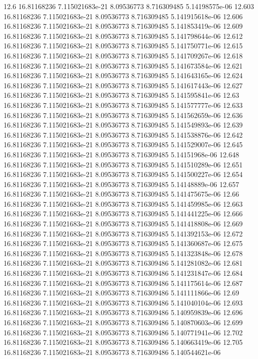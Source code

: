 {12.6 16.81168236 7.115021683e-21 8.09536773 8.716309485 5.14198575e-06
12.603 16.81168236 7.115021683e-21 8.09536773 8.716309485 5.141915618e-06
12.606 16.81168236 7.115021683e-21 8.09536773 8.716309485 5.141853419e-06
12.609 16.81168236 7.115021683e-21 8.09536773 8.716309485 5.141798644e-06
12.612 16.81168236 7.115021683e-21 8.09536773 8.716309485 5.141750771e-06
12.615 16.81168236 7.115021683e-21 8.09536773 8.716309485 5.141709267e-06
12.618 16.81168236 7.115021683e-21 8.09536773 8.716309485 5.141673584e-06
12.621 16.81168236 7.115021683e-21 8.09536773 8.716309485 5.141643165e-06
12.624 16.81168236 7.115021683e-21 8.09536773 8.716309485 5.141617443e-06
12.627 16.81168236 7.115021683e-21 8.09536773 8.716309485 5.141595841e-06
12.63 16.81168236 7.115021683e-21 8.09536773 8.716309485 5.141577777e-06
12.633 16.81168236 7.115021683e-21 8.09536773 8.716309485 5.141562659e-06
12.636 16.81168236 7.115021683e-21 8.09536773 8.716309485 5.141549893e-06
12.639 16.81168236 7.115021683e-21 8.09536773 8.716309485 5.141538876e-06
12.642 16.81168236 7.115021683e-21 8.09536773 8.716309485 5.141529007e-06
12.645 16.81168236 7.115021683e-21 8.09536773 8.716309485 5.14151968e-06
12.648 16.81168236 7.115021683e-21 8.09536773 8.716309485 5.141510289e-06
12.651 16.81168236 7.115021683e-21 8.09536773 8.716309485 5.141500227e-06
12.654 16.81168236 7.115021683e-21 8.09536773 8.716309485 5.14148889e-06
12.657 16.81168236 7.115021683e-21 8.09536773 8.716309485 5.141475675e-06
12.66 16.81168236 7.115021683e-21 8.09536773 8.716309485 5.141459985e-06
12.663 16.81168236 7.115021683e-21 8.09536773 8.716309485 5.141441225e-06
12.666 16.81168236 7.115021683e-21 8.09536773 8.716309485 5.141418808e-06
12.669 16.81168236 7.115021683e-21 8.09536773 8.716309485 5.141392153e-06
12.672 16.81168236 7.115021683e-21 8.09536773 8.716309485 5.141360687e-06
12.675 16.81168236 7.115021683e-21 8.09536773 8.716309485 5.141323848e-06
12.678 16.81168236 7.115021683e-21 8.09536773 8.716309486 5.141281082e-06
12.681 16.81168236 7.115021683e-21 8.09536773 8.716309486 5.141231847e-06
12.684 16.81168236 7.115021683e-21 8.09536773 8.716309486 5.141175614e-06
12.687 16.81168236 7.115021683e-21 8.09536773 8.716309486 5.141111866e-06
12.69 16.81168236 7.115021683e-21 8.09536773 8.716309486 5.141040104e-06
12.693 16.81168236 7.115021683e-21 8.09536773 8.716309486 5.140959839e-06
12.696 16.81168236 7.115021683e-21 8.09536773 8.716309486 5.140870603e-06
12.699 16.81168236 7.115021683e-21 8.09536773 8.716309486 5.140771941e-06
12.702 16.81168236 7.115021683e-21 8.09536773 8.716309486 5.140663419e-06
12.705 16.81168236 7.115021683e-21 8.09536773 8.716309486 5.140544621e-06
}
